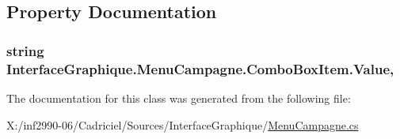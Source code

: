 \subsection{Property Documentation}
\hypertarget{class_interface_graphique_1_1_menu_campagne_1_1_combo_box_item_af32e2bf5eed166e54ce322627482cbff}{
\subsubsection[{Value}]{\setlength{\rightskip}{0pt plus 5cm}string Interface\-Graphique.\-Menu\-Campagne.\-Combo\-Box\-Item.\-Value\hspace{0.3cm}{\ttfamily [get]}, {\ttfamily [set]}}}\label{class_interface_graphique_1_1_menu_campagne_1_1_combo_box_item_af32e2bf5eed166e54ce322627482cbff}


The documentation for this class was generated from the following file\-:\begin{DoxyCompactItemize}
\item 
X\-:/inf2990-\/06/\-Cadriciel/\-Sources/\-Interface\-Graphique/\hyperlink{_menu_campagne_8cs}{Menu\-Campagne.\-cs}\end{DoxyCompactItemize}
